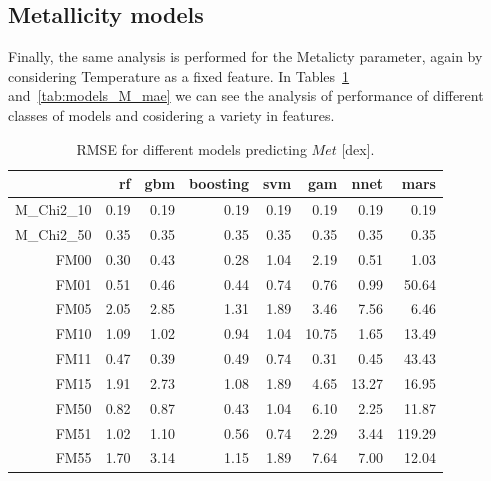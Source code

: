 
\subsection{Metallicity models} 

Finally, the same analysis is performed for the Metalicty parameter, 
again by considering Temperature as a fixed feature.
In Tables~\ref{tab:models_M_rmse} and~\ref{tab:models_M_mae} 
we can see the analysis of performance of different classes of
models and cosidering a variety in features.

\begin{table}[ht]
\centering
\begin{tabular}{rrrrrrrr}
  \hline
 & rf & gbm & boosting & svm & gam & nnet & mars \\ 
  \hline
M\_Chi2\_10 & 0.19 & 0.19 & 0.19 & 0.19 & 0.19 & 0.19 & 0.19 \\ 
 M\_Chi2\_50 & 0.35 & 0.35 & 0.35 & 0.35 & 0.35 & 0.35 & 0.35 \\ 
  FM00 & 0.30 & 0.43 & 0.28 & 1.04 & 2.19 & 0.51 & 1.03 \\ 
  FM01 & 0.51 & 0.46 & 0.44 & 0.74 & 0.76 & 0.99 & 50.64 \\ 
  FM05 & 2.05 & 2.85 & 1.31 & 1.89 & 3.46 & 7.56 & 6.46 \\ 
  FM10 & 1.09 & 1.02 & 0.94 & 1.04 & 10.75 & 1.65 & 13.49 \\ 
  FM11 & 0.47 & 0.39 & 0.49 & 0.74 & 0.31 & 0.45 & 43.43 \\ 
  FM15 & 1.91 & 2.73 & 1.08 & 1.89 & 4.65 & 13.27 & 16.95 \\ 
  FM50 & 0.82 & 0.87 & 0.43 & 1.04 & 6.10 & 2.25 & 11.87 \\ 
  FM51 & 1.02 & 1.10 & 0.56 & 0.74 & 2.29 & 3.44 & 119.29 \\ 
  FM55 & 1.70 & 3.14 & 1.15 & 1.89 & 7.64 & 7.00 & 12.04 \\ 
   \hline
   \end{tabular}
\caption { RMSE for different models predicting $Met$ [dex].} 
\label{tab:models_M_rmse} 
\end{table}
   


